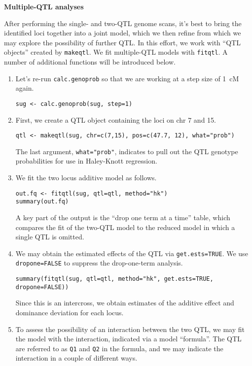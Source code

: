 \documentclass[10pt,letterpaper]{article}
\newcommand{\usercolor}{\color [named]{BlueViolet}}
\begin{document}
\vspace{12pt}
\textbf{Multiple-QTL analyses} \vspace{6pt}
\nopagebreak

After performing the single- and two-QTL genome scans, it's best to
bring the identified loci together into a joint model, which we then
refine from which we may explore the possibility of further QTL.  In
this effort, we work with ``QTL objects'' created by \verb-makeqtl-.
We fit multiple-QTL models with \verb-fitqtl-.  A number of additional
functions will be introduced below.

\begin{enumerate}
\addtocounter{enumi}{52}
\item Let's re-run \verb-calc.genoprob- so that we are working at a
  step size of 1~cM again.

\usercolor
\verb|sug <- calc.genoprob(sug, step=1)|
\normalcolor

\item First, we create a QTL object containing the loci on chr 7 and
  15.

\usercolor
\verb|qtl <- makeqtl(sug, chr=c(7,15), pos=c(47.7, 12), what="prob")|
\normalcolor

The last argument, \verb-what="prob"-, indicates to pull out the QTL
genotype probabilities for use in Haley-Knott regression.

\item We fit the two locus additive model as follows.

\usercolor
\verb|out.fq <- fitqtl(sug, qtl=qtl, method="hk")| \\
\verb|summary(out.fq)|
\normalcolor

A key part of the output is the ``drop one term at a time'' table,
which compares the fit of the two-QTL model to the reduced model in
which a single QTL is omitted.  

\item We may obtain the estimated effects of the QTL via
  \verb-get.ests=TRUE-.  We use \verb-dropone=FALSE- to suppress the
  drop-one-term analysis.

\usercolor
\verb|summary(fitqtl(sug, qtl=qtl, method="hk", get.ests=TRUE, dropone=FALSE))|
\normalcolor

Since this is an intercross, we obtain estimates of the additive
effect and dominance deviation for each locus.

\item To assess the possibility of an interaction between the two
  QTL, we may fit the model with the interaction, indicated via a
  model ``formula''.  The QTL are referred to as \verb-Q1- and
  \verb-Q2- in the formula, and we may indicate the interaction in a
  couple of different ways.


\end{enumerate}
\end{document}
